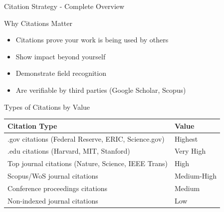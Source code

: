 \documentclass[11pt]{beamer}
\begin{document}
	\begin{frame}{Citation Strategy - Complete Overview}
		\scriptsize
		\begin{block}{Why Citations Matter}
			\begin{itemize}
				\item Citations prove your work is being used by others
				\item Show impact beyond yourself
				\item Demonstrate field recognition
				\item Are verifiable by third parties (Google Scholar, Scopus)
			\end{itemize}
		\end{block}
		\begin{block}{Types of Citations by Value}
			\centering
			\begin{tabular}{|p{4cm}|p{5.5cm}|}
				\hline
				\textbf{Citation Type} & \textbf{Value} \\
				\hline
				.gov citations (Federal Reserve, ERIC, Science.gov) & Highest \\
				\hline
				.edu citations (Harvard, MIT, Stanford) & Very High \\
				\hline
				Top journal citations (Nature, Science, IEEE Trans) & High \\
				\hline
				Scopus/WoS journal citations & Medium-High \\
				\hline
				Conference proceedings citations & Medium \\
				\hline
				Non-indexed journal citations & Low \\
				\hline
			\end{tabular}
		\end{block}
	\end{frame}
	
\end{document}
